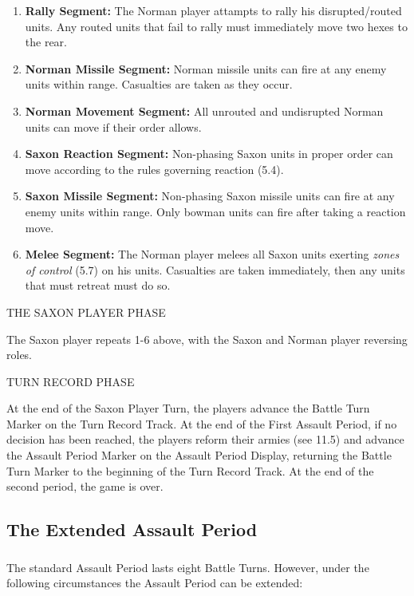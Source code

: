\begin{enumerate}
    \item \textbf{Rally Segment:} The Norman player attampts to rally his disrupted/routed units. Any routed units that fail to rally must immediately move two hexes to the rear.
    \item \textbf{Norman Missile Segment:} Norman missile units can fire at any enemy units within range. Casualties are taken as they occur.
    \item \textbf{Norman Movement Segment:} All unrouted and undisrupted Norman units can move if their order allows.
    \item \textbf{Saxon Reaction Segment:} Non-phasing Saxon units in proper order can move according to the rules governing reaction (5.4).
    \item \textbf{Saxon Missile Segment:} Non-phasing Saxon missile units can fire at any enemy units within range. Only bowman units can fire after taking a reaction move.
    \item \textbf{Melee Segment:} The Norman player melees all Saxon units exerting \textit{zones of control} (5.7) on his units. Casualties are taken immediately, then any units that must retreat must do so.
\end{enumerate}

THE SAXON PLAYER PHASE

The Saxon player repeats 1-6 above, with the Saxon and Norman player reversing roles.

TURN RECORD PHASE

At the end of the Saxon Player Turn, the players advance the Battle Turn Marker on the Turn Record Track. At the end of the First Assault Period, if no decision has been reached, the players reform their armies (see 11.5) and advance the Assault Period Marker on the Assault Period Display, returning the Battle Turn Marker to the beginning of the Turn Record Track. At the end of the second period, the game is over.

\subsection{The Extended Assault Period}

\subsubsection{} The standard Assault Period lasts eight Battle Turns. However, under the following circumstances the Assault Period can be extended:

